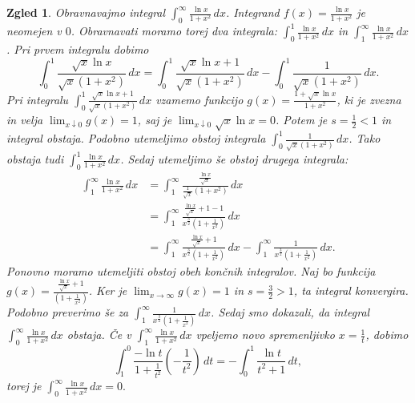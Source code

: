 \documentclass[10pt, a4paper]{article}
\newtheorem{zgled}{Zgled}[section]
\newcommand{\limf}[3]{\lim_{#1 \to #2} {#3}}
\newcommand{\rlimf}[3]{\lim_{#1 \downarrow #2} {#3}}
\begin{document}
\begin{zgled}
    Obravnavajmo integral $\int_0 ^\infty \frac{\ln x}{1 + x^2}\,dx$.
    Integrand $f(x) = \frac{\ln x}{1 + x^2}$ je neomejen v $0$.
    Obravnavati moramo torej dva integrala: $\int_0 ^1 \frac{\ln x}{1 + x^2}\,dx$ in $\int_1 ^\infty \frac{\ln x}{1 + x^2}\,dx$. 
    Pri prvem integralu dobimo $$\int_0 ^1 \frac{\sqrt{x} \ln x}{\sqrt{x} (1 + x^2)}\,dx = \int_0 ^1 \frac{\sqrt{x} \ln x + 1}{\sqrt{x} (1 + x^2)}\,dx - \int_0 ^1 \frac{1}{\sqrt{x} (1 + x^2)}\,dx.$$
    Pri integralu $\int_0 ^1 \frac{\sqrt{x} \ln x + 1}{\sqrt{x} (1 + x^2)}\,dx$ vzamemo funkcijo $g(x) = \frac{1+ \sqrt{x} \ln x}{1 + x^2}$, ki je zvezna in velja $\rlimf{x}{0}{g(x)} = 1$, saj je $\rlimf{x}{0}{\sqrt{x} \ln x} = 0$. 
    Potem je $s = \frac{1}{2} < 1$ in integral obstaja.
    Podobno utemeljimo obstoj integrala $\int_0 ^1 \frac{1}{\sqrt{x} (1 + x^2)}\,dx$.
    Tako obstaja tudi $\int_0 ^1 \frac{\ln x}{1 + x^2}\,dx$.
    Sedaj utemeljimo še obstoj drugega integrala:
    \begin{align*}
        \int_1 ^\infty \frac{\ln x}{1 + x^2}\,dx &= \int_1 ^\infty \frac{\frac{\ln x}{\sqrt{x}}}{\frac{1}{\sqrt{x}} (1 + x^2)}\,dx\\
        &= \int_1 ^\infty \frac{\frac{\ln x}{\sqrt{x}} + 1 - 1}{x^{\frac{3}{2}} (1 + \frac{1}{x^2})}\,dx\\
        &= \int_1 ^\infty \frac{\frac{\ln x}{\sqrt{x}} + 1}{x^{\frac{3}{2}} (1 + \frac{1}{x^2})}\,dx - \int_1 ^\infty \frac{1}{x^{\frac{3}{2}} (1 + \frac{1}{x^2})}\,dx.
    \end{align*}
    Ponovno moramo utemeljiti obstoj obeh končnih integralov.
    Naj bo funkcija $g(x) = \frac{\frac{\ln x}{\sqrt{x}} + 1}{(1 + \frac{1}{x^2})}$. Ker je $\limf{x}{\infty}{g(x)} = 1$ in $s = \frac{3}{2} > 1$, ta integral konvergira.
    Podobno preverimo še za $\int_1 ^\infty \frac{1}{x^{\frac{3}{2}} (1 + \frac{1}{x^2})}\,dx$. Sedaj smo dokazali, da integral $\int_0 ^\infty \frac{\ln x}{1 + x^2}\,dx$ obstaja.
    Če v $\int_1 ^\infty \frac{\ln x}{1 + x^2}\,dx$ vpeljemo novo spremenljivko $x = \frac{1}{t}$, dobimo $$\int_1 ^0 \frac{- \ln t}{1 + \frac{1}{t^2}} (-\frac{1}{t^2})\,dt = - \int_0 ^1 \frac{\ln t}{t^2 + 1}\,dt,$$
    torej je $\int_0 ^\infty \frac{\ln x}{1 + x^2}\,dx = 0.$
\end{zgled}
\end{document}
